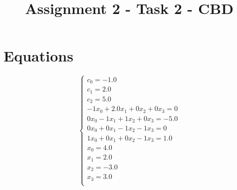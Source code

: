 \documentclass[a4paper,12pt]{article}
\begin{document}
\title{Assignment 2 - Task 2 - CBD}\date{}\maketitle
\section{Equations}
\[
\left\{
\begin{array}{c}
c_0 = -1.0 \\
c_1 = 2.0 \\
c_2 = 5.0 \\
-1x_0+2.0x_1+0x_2+0x_3 = 0 \\
0x_0-1x_1+1x_2+0x_3 = -5.0 \\
0x_0+0x_1-1x_2-1x_3 = 0 \\
1x_0+0x_1+0x_2-1x_3 = 1.0 \\x_0 = 4.0 \\
x_1 = 2.0 \\
x_2 = -3.0 \\
x_3 = 3.0 \\
\end{array}
\right.
\]
\end{document}
